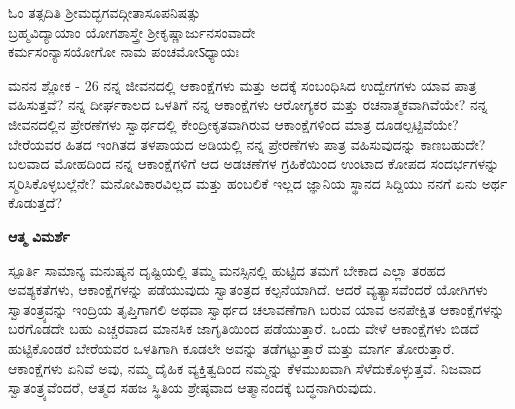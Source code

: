 \begin{center}
ಓಂ ತತ್ಸದಿತಿ ಶ್ರೀಮದ್ಭಗವದ್ಗೀತಾಸೂಪನಿಷತ್ಸು\\
ಬ್ರಹ್ಮವಿದ್ಯಾಯಾಂ ಯೋಗಶಾಸ್ತ್ರೇ ಶ್ರೀಕೃಷ್ಣಾರ್ಜುನಸಂವಾದೇ\\
ಕರ್ಮಸಂನ್ಯಾಸಯೋಗೋ ನಾಮ ಪಂಚಮೋऽಧ್ಯಾಯಃ 
\end{center}

\newpage
\begin{mananam}{\mananamfont ಮನನ ಶ್ಲೋಕ - \textenglish{26}}
\footnotesize \mananamtext ನನ್ನ ಜೀವನದಲ್ಲಿ ಆಕಾಂಕ್ಷೆಗಳು ಮತ್ತು ಅದಕ್ಕೆ ಸಂಬಂಧಿಸಿದ ಉದ್ವೇಗಗಳು ಯಾವ ಪಾತ್ರ ವಹಿಸುತ್ತವೆ? ನನ್ನ ದೀರ್ಘಕಾಲದ ಒಳತಿಗೆ ನನ್ನ ಆಕಾಂಕ್ಷೆಗಳು ಆರೋಗ್ಯಕರ ಮತ್ತು ರಚನಾತ್ಮಕವಾಗಿವೆಯೇ? ನನ್ನ ಜೀವನದಲ್ಲಿನ ಪ್ರೇರಣೆಗಳು ಸ್ವಾರ್ಥದಲ್ಲಿ ಕೇಂದ್ರೀಕೃತವಾಗಿರುವ ಆಕಾಂಕ್ಷೆಗಳಿಂದ ಮಾತ್ರ ದೂಡಲ್ಪಟ್ಟಿವೆಯೇ? ಬೇರೆಯವರ ಹಿತದ ಇಂಗಿತದ ತಳಪಾಯದ ಅಡಿಯಲ್ಲಿ ನನ್ನ ಪ್ರೇರಣೆಗಳು ಪಾತ್ರ ವಹಿಸುವುದನ್ನು ಕಾಣಬಹುದೇ? ಬಲವಾದ ಮೋಹದಿಂದ ನನ್ನ ಆಕಾಂಕ್ಷೆಗಳಿಗೆ ಆದ ಅಡಚಣೆಗಳ ಗ್ರಹಿಕೆಯಿಂದ ಉಂಟಾದ ಕೋಪದ ಸಂದರ್ಭಗಳನ್ನು ಸ್ಮರಿಸಿಕೊಳ್ಳಬಲ್ಲೆನೇ? ಮನೋವಿಕಾರವಿಲ್ಲದ ಮತ್ತು ಹಂಬಲಿಕೆ ಇಲ್ಲದ ಜ್ಞಾನಿಯ ಸ್ಥಾನದ ಸಿದ್ದಿಯು ನನಗೆ ಏನು ಅರ್ಥ ಕೊಡುತ್ತದೆ?
\end{mananam}
\WritingHand\enspace\textbf{ಆತ್ಮ ವಿಮರ್ಶೆ}\\
\begin{inspiration}{\mananamfont ಸ್ಪೂರ್ತಿ}
\footnotesize \mananamtext ಸಾಮಾನ್ಯ ಮನುಷ್ಯನ ದೃಷ್ಟಿಯಲ್ಲಿ ತಮ್ಮ ಮನಸ್ಸಿನಲ್ಲಿ ಹುಟ್ಟಿದ ತಮಗೆ ಬೇಕಾದ ಎಲ್ಲಾ ತರಹದ ಅವಶ್ಯಕತೆಗಳು, ಆಕಾಂಕ್ಷೆಗಳನ್ನು ಪಡೆಯುವುದು ಸ್ವಾತಂತ್ರದ ಕಲ್ಪನೆಯಾಗಿದೆ. ಆದರೆ ವ್ಯತ್ಯಾಸವೆಂದರೆ ಯೋಗಿಗಳು ಸ್ವಾತಂತ್ರ್ಯವನ್ನು ಇಂದ್ರಿಯ ತೃಪ್ತಿಗಾಗಲಿ ಅಥವಾ ಸ್ವಾರ್ಥದ ಚಲಾವಣೆಗಾಗಿ ಬರುವ ಯಾವ ಅನಪೇಕ್ಷಿತ ಆಕಾಂಕ್ಷೆಗಳನ್ನು ಬರಗೊಡದೇ ಬಹು ಎಚ್ಚರವಾದ ಮಾನಸಿಕ ಜಾಗೃತಿಯಿಂದ ಪಡೆಯುತ್ತಾರೆ. ಒಂದು ವೇಳೆ ಆಕಾಂಕ್ಷೆಗಳು ಬಿಡದೆ ಹುಟ್ಟಿಕೊಂಡರೆ ಬೇರೆಯವರ ಒಳತಿಗಾಗಿ ಕೂಡಲೇ ಅವನ್ನು ತಡೆಗಟ್ಟುತ್ತಾರೆ ಮತ್ತು ಮಾರ್ಗ ತೋರುತ್ತಾರೆ. ಆಕಾಂಕ್ಷೆಗಳು ಏನಿವೆ ಅವು, ನಮ್ಮ ದೈಹಿಕ ವ್ಯಕ್ತಿತ್ವದಿಂದ ನಮ್ಮನ್ನು ಕೆಳಮುಖವಾಗಿ ಸೆಳೆದುಕೊಳ್ಳುತ್ತವೆ. ನಿಜವಾದ ಸ್ವಾತಂತ್ರ್ಯವೆಂದರೆ, ಆತ್ಮದ ಸಹಜ ಸ್ಥಿತಿಯ  ಶ್ರೇಷ್ಠವಾದ  ಆತ್ಮಾನಂದಕ್ಕೆ   ಬದ್ಧನಾಗಿರುವುದು.
\end{inspiration}
\newpage

